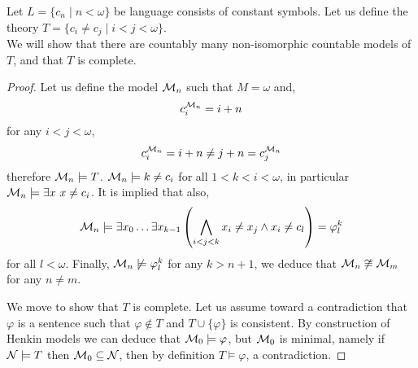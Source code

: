 \question{}
Let $L = \{ c_n \mid n < \omega \}$ be language consists of constant symbols.
Let us define the theory $T = \{ c_i \ne c_j \mid i < j < \omega \}$. \\
We will show that there are countably many non-isomorphic countable models of $T$, and that $T$ is complete.
\begin{proof}
	Let us define the model $\mathcal{M}_n$ such that $M = \omega$ and,
	\[
		c_i^{\mathcal{M}_n} = i + n
	\]
	for any $i < j < \omega$,
	\[
		c_i^{\mathcal{M}_n}
		= i + n
		\ne j + n
		= c_j^{\mathcal{M}_n}
	\]
	therefore $\mathcal{M}_n \models T$.
	$\mathcal{M}_n \models k \ne c_i$ for all $1 < k < i < \omega$, in particular $\mathcal{M}_n \models \exists x\ x \ne c_i$.
	It is implied that also,
	\[
		\mathcal{M}_n
		\models \exists x_0 \ldots \exists x_{k - 1} \left( \bigwedge_{i < j < k} x_i \ne x_j \land x_i \ne c_l \right)
		= \varphi_l^k
	\]
	for all $l < \omega$.
	Finally, $\mathcal{M}_n \not\models \varphi_l^k$ for any $k > n + 1$, we deduce that $\mathcal{M}_n \not\cong \mathcal{M}_m$ for any $n \ne m$.

	We move to show that $T$ is complete.
	Let us assume toward a contradiction that $\varphi$ is a sentence such that $\varphi \notin T$ and $T \cup \{ \varphi \}$ is consistent.
	By construction of Henkin models we can deduce that $\mathcal{M}_0 \models \varphi$, but $\mathcal{M}_0$ is minimal, namely if $\mathcal{N} \models T$ then $\mathcal{M}_0 \subseteq \mathcal{N}$,
	then by definition $T \models \varphi$, a contradiction.
\end{proof}

